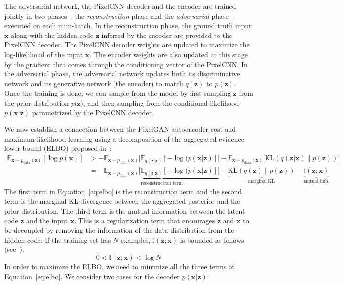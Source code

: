 \documentclass{article}
\newcommand{\myeq}[1]{\hyperref[eq:#1]{Equation~\ref*{eq:#1}}}
\begin{document}
The adversarial network, the PixelCNN decoder and the encoder are trained jointly in two phases -- the \emph{reconstruction} phase and the \emph{adversarial} phase -- executed on each mini-batch. In the reconstruction phase, the ground truth input $\mathbf{x}$ along with the hidden code $\mathbf{z}$ inferred by the encoder are provided to the PixelCNN decoder. The PixelCNN decoder weights are updated to maximize the log-likelihood of the input $\mathbf{x}$. The encoder weights are also updated at this stage by the gradient that comes through the conditioning vector of the PixelCNN. In the adversarial phase, the adversarial network updates both its discriminative network and its generative network (the encoder) to match $q(\mathbf{z})$ to $p(\mathbf{z})$. Once the training is done, we can sample from the model by first sampling $\mathbf{z}$ from the prior distribution $p(\mathbf{z)}$, and then sampling from the conditional likelihood $p(\mathbf{x}|\mathbf{z})$ parametrized by the PixelCNN decoder.
 


We now establish a connection between the PixelGAN autoencoder cost and maximum likelihood learning using a decomposition of the aggregated evidence lower bound (ELBO) proposed in~\citep{surgery}:
\begin{align}
\mathbb{E}_{\mathbf{x} \sim p_\text{data}(\mathbf{x})}[\log p(\mathbf{x})] &> 
-\mathbb{E}_{\mathbf{x} \sim p_\text{data}(\mathbf{x})}\Big[\mathbb{E}_{q(\mathbf{z}|\mathbf{x})} [-\log(p(\mathbf{x}|\mathbf{z})]\Big]
- \mathbb{E}_{\mathbf{x} \sim p_\text{data}(\mathbf{x})}\Big[\text{KL}( q(\mathbf{z}|\mathbf{x})\|p(\mathbf{z}))\Big]\\
&=
-\underbrace{\mathbb{E}_{\mathbf{x} \sim p_\text{data}(\mathbf{x})}\Big[\mathbb{E}_{q(\mathbf{z}|\mathbf{x})} [-\log(p(\mathbf{x}|\mathbf{z})]\Big]}_\text{reconstruction term} 
- \underbrace{\text{KL}( q(\mathbf{z})\|p(\mathbf{z}))}_\text{marginal KL}
- \underbrace{\mathbb{I}(\mathbf{z};\mathbf{x})}_\text{mutual info.} \label{eq:elbo}
\end{align}
The first term in \myeq{elbo} is the reconstruction term and the second term is the marginal KL divergence between the aggregated posterior and the prior distribution. The third term is the mutual information between the latent code $\mathbf{z}$ and the input $\mathbf{x}$. This is a regularization term that encourages $\mathbf{z}$ and $\mathbf{x}$ to be decoupled by removing the information of the data distribution from the hidden code.
If the training set has $N$ examples, $\mathbb{I}(\mathbf{z};\mathbf{x})$ is bounded as follows (see~\citep{surgery}).
\begin{equation}\label{eq:bound}
0<\mathbb{I}(\mathbf{z};\mathbf{x}) < \log N
\end{equation}
In order to maximize the ELBO, we need to minimize all the three terms of \myeq{elbo}.
We consider two cases for the decoder $p(\mathbf{x}|\mathbf{z})$:
\end{document}
